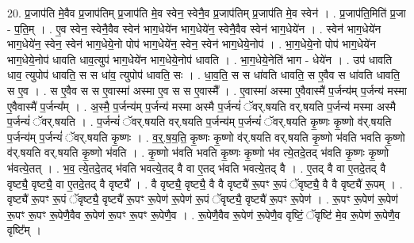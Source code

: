 \documentclass[17pt]{extarticle}
\begin{document}
20. प्र॒जाप॑ति मे॒वैव प्र॒जाप॑तिम् प्र॒जाप॑ति मे॒व स्वेन॒ स्वेनै॒व प्र॒जाप॑तिम् प्र॒जाप॑ति मे॒व स्वेन॑ । . प्र॒जाप॑ति॒मिति॑ प्र॒जा - प॒ति॒म् । . ए॒व स्वेन॒ स्वेनै॒वैव स्वेन॑ भाग॒धेये॑न भाग॒धेये॑न॒ स्वेनै॒वैव स्वेन॑ भाग॒धेये॑न । . स्वेन॑ भाग॒धेये॑न भाग॒धेये॑न॒ स्वेन॒ स्वेन॑ भाग॒धेये॒नो पोप॑ भाग॒धेये॑न॒ स्वेन॒ स्वेन॑ भाग॒धेये॒नोप॑ । . भा॒ग॒धेये॒नो पोप॑ भाग॒धेये॑न भाग॒धेये॒नोप॑ धावति धाव॒त्युप॑ भाग॒धेये॑न भाग॒धेये॒नोप॑ धावति । . भा॒ग॒धेये॒नेति॑ भाग - धेये॑न । . उप॑ धावति धाव॒ त्युपोप॑ धावति॒ स स धा॑व॒ त्युपोप॑ धावति॒ सः । . धा॒व॒ति॒ स स धा॑वति धावति॒ स ए॒वैव स धा॑वति धावति॒ स ए॒व । . स ए॒वैव स स ए॒वास्मा॑ अस्मा ए॒व स स ए॒वास्मै᳚ । . ए॒वास्मा॑ अस्मा ए॒वैवास्मै॑ प॒र्जन्य॑म् प॒र्जन्य॑ मस्मा ए॒वैवास्मै॑ प॒र्जन्य᳚म् । . अ॒स्मै॒ प॒र्जन्य॑म् प॒र्जन्य॑ मस्मा अस्मै प॒र्जन्यं॑ ॅवर्.षयति वर्.षयति प॒र्जन्य॑ मस्मा अस्मै प॒र्जन्यं॑ ॅवर्.षयति । . प॒र्जन्यं॑ ॅवर्.षयति वर्.षयति प॒र्जन्य॑म् प॒र्जन्यं॑ ॅवर्.षयति कृ॒ष्णः कृ॒ष्णो व॑र्.षयति प॒र्जन्य॑म् प॒र्जन्यं॑ ॅवर्.षयति कृ॒ष्णः । . व॒र्॒.ष॒य॒ति॒ कृ॒ष्णः कृ॒ष्णो व॑र्.षयति वर्.षयति कृ॒ष्णो भ॑वति भवति कृ॒ष्णो व॑र्.षयति वर्.षयति कृ॒ष्णो भ॑वति । . कृ॒ष्णो भ॑वति भवति कृ॒ष्णः कृ॒ष्णो भ॑व त्ये॒तदे॒तद् भ॑वति कृ॒ष्णः कृ॒ष्णो भ॑वत्ये॒तत् । . भ॒व॒ त्ये॒तदे॒तद् भ॑वति भवत्ये॒तद् वै वा ए॒तद् भ॑वति भवत्ये॒तद् वै । . ए॒तद् वै वा ए॒तदे॒तद् वै वृष्ट्यै॒ वृष्ट्यै॒ वा ए॒तदे॒तद् वै वृष्ट्यै᳚ । . वै वृष्ट्यै॒ वृष्ट्यै॒ वै वै वृष्ट्यै॑ रू॒पꣳ रू॒पं ॅवृष्ट्यै॒ वै वै वृष्ट्यै॑ रू॒पम् । . वृष्ट्यै॑ रू॒पꣳ रू॒पं ॅवृष्ट्यै॒ वृष्ट्यै॑ रू॒पꣳ रू॒पेण॑ रू॒पेण॑ रू॒पं ॅवृष्ट्यै॒ वृष्ट्यै॑ रू॒पꣳ रू॒पेण॑ । . रू॒पꣳ रू॒पेण॑ रू॒पेण॑ रू॒पꣳ रू॒पꣳ रू॒पेणै॒वैव रू॒पेण॑ रू॒पꣳ रू॒पꣳ रू॒पेणै॒व । . रू॒पेणै॒वैव रू॒पेण॑ रू॒पेणै॒व वृष्टिं॒ ॅवृष्टि॑ मे॒व रू॒पेण॑ रू॒पेणै॒व वृष्टि᳚म् । \newline
\end{document}
